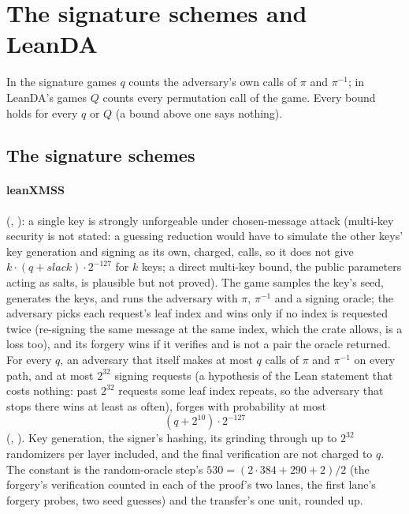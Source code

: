\documentclass[11pt]{article}
\begin{document}
\section{The signature schemes and LeanDA}\label{sec:schemes}

In the signature games $q$ counts the adversary's own calls of $\pi$ and $\pi^{-1}$; in LeanDA's games
$Q$ counts every permutation call of the game. Every bound holds for every $q$ or $Q$ (a bound above
one says nothing).

\subsection*{The signature schemes}

\paragraph{leanXMSS} (,
): a single key is strongly unforgeable under chosen-message attack
(multi-key security is not stated: a guessing reduction would have to simulate the other keys' key
generation and signing as its own, charged, calls, so it does not give $k\cdot(q+\mathit{slack})\cdot2^{-127}$ for
$k$ keys; a direct multi-key bound, the public parameters acting as salts, is plausible but not proved).
The game samples the key's seed, generates the keys, and runs the adversary with $\pi$,
$\pi^{-1}$ and a signing oracle; the adversary picks each request's leaf index and wins
only if no index is requested twice (re-signing the same message at the same index, which the crate allows, is a loss too), and its forgery wins if it verifies and is not a pair the
oracle returned. For every $q$, an adversary that itself makes at most $q$ calls of $\pi$ and
$\pi^{-1}$ on every path, and at most $2^{32}$ signing requests (a hypothesis of the Lean statement that costs nothing: past $2^{32}$ requests some leaf index repeats, so the adversary that stops there wins at least as often),
forges with probability at most
\[
\boxed{\ (q + 2^{10})\cdot 2^{-127}\ }
\]
(, ). Key
generation, the signer's hashing, its grinding through up to $2^{32}$ randomizers per layer
included, and the final verification are not charged to $q$. The constant is the random-oracle
step's $530 = (2\cdot384 + 290 + 2)/2$ (the forgery's verification counted in each of the proof's two
lanes, the first lane's forgery probes, two seed guesses) and the transfer's one unit, rounded up.
\end{document}
